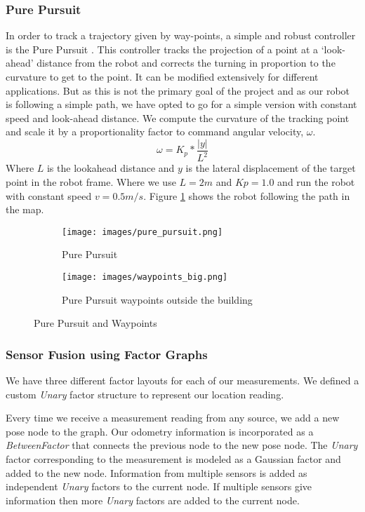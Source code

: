 \documentclass[10pt, reqno, letterpaper, twoside]{amsart}
\begin{document}
\subsubsection{\textbf{Pure Pursuit}}
In order to track a trajectory given by way-points, a simple and robust controller is the Pure Pursuit \cite{pure_pursuit_1992}. This controller tracks the projection of a point at a ‘look-ahead’ distance from the robot and corrects the turning in proportion to the curvature to get to the point. It can be modified extensively for different applications. But as this is not the primary goal of the project and as our robot is following a simple path, we have opted to go for a simple version with constant speed and look-ahead distance. We compute the curvature of the tracking point and scale it by a proportionality factor to command angular velocity, $\omega$. 
\begin{equation*}
    \omega = K_p * \frac{|y|}{L^2}
\end{equation*}
Where $L$ is the lookahead distance and $y$ is the lateral displacement of the target point in the robot frame. 
Where we use $L  = 2m$ and $Kp = 1.0$ and run the robot with constant speed $v = 0.5m/s$. Figure \ref{pure_pursuit} shows the robot following the path in the map.
\begin{figure}
     \centering
     \begin{subfigure}[b]{0.45\textwidth}
         \centering
         \texttt{[image: images/pure\_pursuit.png]}
         \caption{Pure Pursuit}
         \label{pure_pursuit}
     \end{subfigure}
     \hfill
     \begin{subfigure}[b]{0.45\textwidth}
         \centering
         \texttt{[image: images/waypoints\_big.png]}
         \caption{Pure Pursuit waypoints outside the building}
         \label{pure_pursuit_outdoor}
     \end{subfigure}
        \caption{Pure Pursuit and Waypoints}
        \label{pure_pursuit_waypoints}
\end{figure}

\subsubsection{\textbf{Sensor Fusion using Factor Graphs}}
We have three different factor layouts for each of our measurements. We defined a custom \emph{Unary} factor structure to represent our location reading.

Every time we receive a measurement reading from any source, we add a new pose node to the graph.
Our odometry information is incorporated as a \emph{BetweenFactor} that connects the previous node to the new pose node. The \emph{Unary} factor corresponding to the measurement is modeled as a Gaussian factor and added to the new node. Information from multiple sensors is added as independent \emph{Unary} factors to the current node.
If multiple sensors give information then more \emph{Unary} factors are added to the current node. 
\end{document}
